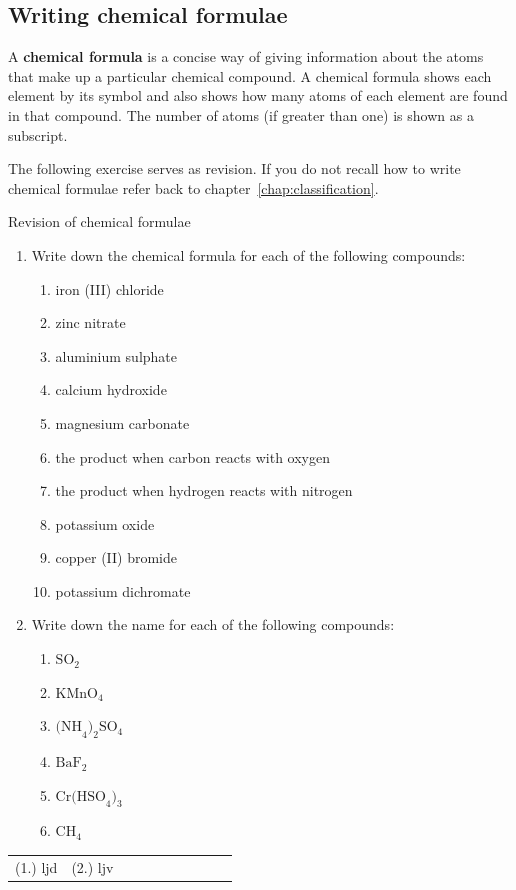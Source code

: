 \subsection*{Writing chemical formulae}
\nopagebreak
\label{m38721*id62835}A \textbf{chemical formula} is a concise way of giving information about the atoms that make up a particular chemical compound. A chemical formula shows each element by its symbol and also shows how many atoms of each element are found in that compound. The number of atoms (if greater than one) is shown as a subscript.\par 
The following exercise serves as revision. If you do not recall how to write chemical formulae refer back to chapter~\ref{chap:classification}.
\begin{exercises}{Revision of chemical formulae}
\begin{enumerate}[noitemsep, label=\textbf{\arabic*}.]
  \item Write down the chemical formula for each of the following compounds:
\begin{enumerate}[noitemsep, label=\textbf{\alph*}. ]
 \item iron (III) chloride
\item zinc nitrate
\item aluminium sulphate
\item calcium hydroxide
\item magnesium carbonate
\item the product when carbon reacts with oxygen
\item the product when hydrogen reacts with nitrogen
\item potassium oxide
\item copper (II) bromide
\item potassium dichromate
\end{enumerate}
\item Write down the name for each of the following compounds:
\begin{enumerate}[noitemsep, label=\textbf{\alph*}. ]
 \item $\text{SO}_2$
\item $\text{KMnO}_4$
\item $\text{(NH}_{4}\text{)}_{2}\text{SO}_{4}$
\item $\text{BaF}_2$
\item $\text{Cr(HSO}_{4}\text{)}_{3}$
\item $\text{CH}_{4}$
\end{enumerate}
\end{enumerate}
 \par \begin{tabular}[h]{cccccc}
 (1.) ljd  &  (2.) ljv   &   &    &  &   &   &   &   &    & \end{tabular}
\end{exercises}

